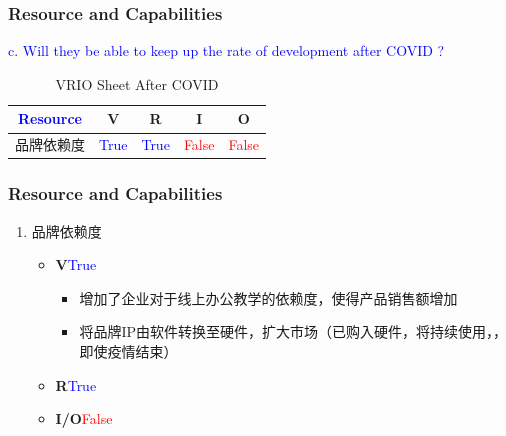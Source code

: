 \documentclass{beamer}
\begin{document}
\begin{frame}[allowframebreaks]
    \frametitle{Resource and Capabilities}
    \textcolor{blue}{c.	Will they be able to keep up the rate of development after COVID ?}
    \begin{table}
    \begin{tabular}{c c c c c}
    \toprule
    \textcolor{blue}{\textbf{Resource}} & \textbf{V} & \textbf{R} & \textbf{I} & \textbf{O} \\
    \midrule
    品牌依赖度  & \textcolor{blue}{True} & \textcolor{blue}{True} & \textcolor{red}{False} & \textcolor{red}{False}\\
    \bottomrule
    \end{tabular}
    \caption{VRIO Sheet After COVID}
    \end{table}
    \frametitle{Resource and Capabilities}
    \begin{enumerate}
        \item 品牌依赖度
        \begin{itemize}
            \item \textbf{V}\quad \textcolor{blue}{True} 
            \begin{itemize}
                \item 增加了企业对于线上办公教学的依赖度，使得产品销售额增加
                \item 将品牌IP由软件转换至硬件，扩大市场（已购入硬件，将持续使用，，即使疫情结束）
            \end{itemize}
            \item \textbf{R}\quad \textcolor{blue}{True}
            \item \textbf{I/O}\quad \textcolor{red}{False}
        \end{itemize}
    \end{enumerate}
    \end{frame}
    
    
\end{document}
